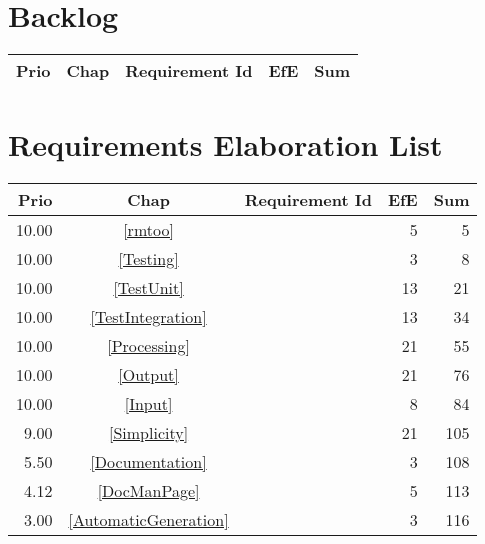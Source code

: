 \section{Backlog}
\begin{longtable}{|r|c|p{7cm}||r|r|} \hline
\textbf{Prio} & \textbf{Chap} & \textbf{Requirement Id} & \textbf{EfE} & \textbf{Sum} \\ \hline\endhead
\end{longtable}\section{Requirements Elaboration List}
\begin{longtable}{|r|c|p{7cm}||r|r|} \hline
\textbf{Prio} & \textbf{Chap} & \textbf{Requirement Id} & \textbf{EfE} & \textbf{Sum} \\ \hline\endhead
10.00 & \ref{rmtoo} & \nameref{rmtoo} & 5 & 5 \\ \hline
10.00 & \ref{Testing} & \nameref{Testing} & 3 & 8 \\ \hline
10.00 & \ref{TestUnit} & \nameref{TestUnit} & 13 & 21 \\ \hline
10.00 & \ref{TestIntegration} & \nameref{TestIntegration} & 13 & 34 \\ \hline
10.00 & \ref{Processing} & \nameref{Processing} & 21 & 55 \\ \hline
10.00 & \ref{Output} & \nameref{Output} & 21 & 76 \\ \hline
10.00 & \ref{Input} & \nameref{Input} & 8 & 84 \\ \hline
9.00 & \ref{Simplicity} & \nameref{Simplicity} & 21 & 105 \\ \hline
5.50 & \ref{Documentation} & \nameref{Documentation} & 3 & 108 \\ \hline
4.12 & \ref{DocManPage} & \nameref{DocManPage} & 5 & 113 \\ \hline
3.00 & \ref{AutomaticGeneration} & \nameref{AutomaticGeneration} & 3 & 116 \\ \hline
\end{longtable}